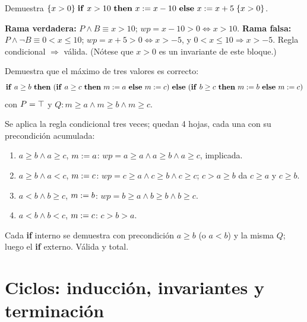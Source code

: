 \begin{prob}
Demuestra $\hoare{x>0}{\kw{if}\ x>10\ \kw{then}\ x\asg x-10\ \kw{else}\ x\asg x+5}{x>0}$.
\end{prob}
\begin{sol}
\textbf{Rama verdadera:} $P\land B\equiv x>10$; $wp=x-10>0\iff x>10$. \checkmark
\textbf{Rama falsa:} $P\land\neg B\equiv 0<x\le10$; $wp=x+5>0\iff x>-5$, y $0<x\le10\Rightarrow x>-5$. \checkmark
Regla condicional $\Rightarrow$ válida. (Nótese que $x>0$ es un invariante de este bloque.)
\end{sol}

\begin{prob}[\reto]
Demuestra que el máximo de tres valores es correcto:
\[\kw{if}\ a\ge b\ \kw{then}\ (\kw{if}\ a\ge c\ \kw{then}\ m\asg a\ \kw{else}\ m\asg c)\ \kw{else}\ (\kw{if}\ b\ge c\ \kw{then}\ m\asg b\ \kw{else}\ m\asg c)\]
con $P=\top$ y $Q: m\ge a\land m\ge b\land m\ge c$.
\end{prob}
\begin{sol}
Se aplica la regla condicional tres veces; quedan 4 hojas, cada una con su precondición acumulada:
\begin{enumerate}
\item $a\ge b\land a\ge c$, $m\mathrel{:=} a$: $wp=a\ge a\land a\ge b\land a\ge c$, implicada. \checkmark
\item $a\ge b\land a<c$, $m\mathrel{:=} c$: $wp=c\ge a\land c\ge b\land c\ge c$; $c>a\ge b$ da $c\ge a$ y $c\ge b$. \checkmark
\item $a<b\land b\ge c$, $m\mathrel{:=} b$: $wp=b\ge a\land b\ge b\land b\ge c$. \checkmark
\item $a<b\land b<c$, $m\mathrel{:=} c$: $c>b>a$. \checkmark
\end{enumerate}
Cada \textbf{if} interno se demuestra con precondición $a\ge b$ (o $a<b$) y la misma $Q$; luego el \textbf{if} externo. Válida y total.
\end{sol}

\section{Ciclos: inducción, invariantes y terminación}

